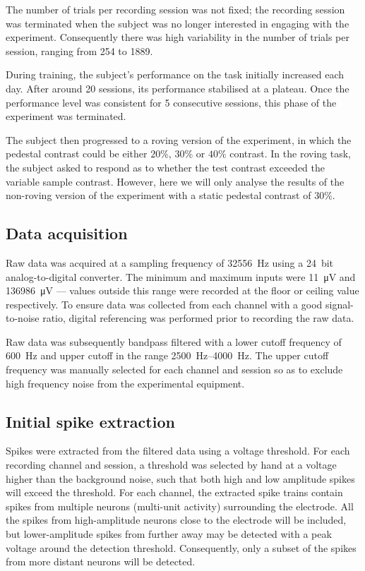The number of trials per recording session was not fixed; the recording session was terminated when the subject was no longer interested in engaging with the experiment.
Consequently there was high variability in the number of trials per session, ranging from \num{254} to \num{1889}.

During training, the subject's performance on the task initially increased each day.
After around \num{20} sessions, its performance stabilised at a plateau.
Once the performance level was consistent for \num{5} consecutive sessions, this phase of the experiment was terminated.

The subject then progressed to a roving version of the experiment, in which the pedestal contrast could be either $20\%$, $30\%$ or $40\%$ contrast.
In the roving task, the subject asked to respond as to whether the test contrast exceeded the variable sample contrast.
However, here we will only analyse the results of the non-roving version of the experiment with a static pedestal contrast of $30\%$.


\subsection{Data acquisition}

Raw data was acquired at a sampling frequency of \SI{32556}{Hz} using a \SI{24}{bit} analog-to-digital converter.
The minimum and maximum inputs were \SI{11}{\micro\volt} and \SI{136986}{\micro\volt} --- values outside this range were recorded at the floor or ceiling value respectively.
To ensure data was collected from each channel with a good signal-to-noise ratio, digital referencing was performed prior to recording the raw data.

Raw data was subsequently bandpass filtered with a lower cutoff frequency of \SI{600}{Hz} and upper cutoff in the range \SIrange{2500}{4000}{Hz}.
The upper cutoff frequency was manually selected for each channel and session so as to exclude high frequency noise from the experimental equipment.


\subsection{Initial spike extraction}
\label{sec:pl_spike_extraction}

Spikes were extracted from the filtered data using a voltage threshold.
For each recording channel and session, a threshold was selected by hand at a voltage higher than the background noise, such that both high and low amplitude spikes will exceed the threshold.
For each channel, the extracted spike trains contain spikes from multiple neurons (multi-unit activity) surrounding the electrode.
All the spikes from high-amplitude neurons close to the electrode will be included, but lower-amplitude spikes from further away may be detected with a peak voltage around the detection threshold.
Consequently, only a subset of the spikes from more distant neurons will be detected.

